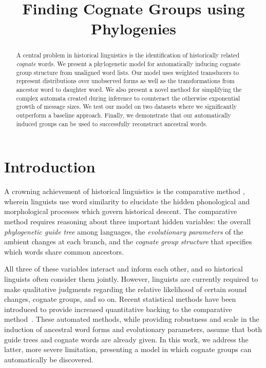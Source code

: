 \documentclass[11pt,a4paper]{article}
\title{Finding Cognate Groups using Phylogenies}
\author{}
\date{}
\begin{document}
\maketitle
\begin{abstract}
  A central problem in historical linguistics is the identification
  of historically related \emph{cognate} words.  We present a phylogenetic model for
  automatically inducing cognate group structure from unaligned word lists.
  Our model uses
  weighted transducers to represent distributions over unobserved
  forms as well as the transformations from ancestor word to daughter
  word. We also present a novel method for simplifying the complex
  automata created during inference to counteract the otherwise
  exponential growth of message sizes. We test our model on two
  datasets where we significantly outperform a baseline approach.
  Finally, we demonstrate that our automatically induced
  groups can be used to successfully reconstruct ancestral words.
\end{abstract}
\section{Introduction}

A crowning achievement of historical linguistics is the comparative
method \cite{ohala93phonetics}, wherein linguists use word similarity
to elucidate the hidden phonological and morphological processes
which govern historical descent. The comparative method requires
reasoning about three important hidden variables: the overall
\emph{phylogenetic guide tree} among languages, the \emph{evolutionary
parameters} of the ambient changes at each branch, and the \emph{cognate
group structure} that specifies which words share common ancestors.

All three of these variables interact and inform each other, and
so historical linguists often consider them jointly.  However,
linguists are currently required to make qualitative judgments
regarding the relative likelihood of certain sound changes, cognate
groups, and so on.  Recent statistical methods have been introduced
to provide increased quantitative backing to the comparative
method~\cite{oakes00computer,bouchard07probabilistic,bouchard09improved}.
These automated methods, while providing robustness and scale in
the induction of ancestral word forms and evolutionary parameters,
assume that both guide trees and cognate words are already given.
In this work, we address the latter, more severe limitation,
presenting a model in which cognate groups can automatically be
discovered.
\end{document}
